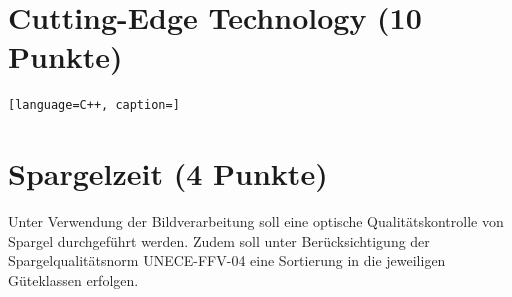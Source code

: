 \documentclass{ezb}
\begin{document}

\section{Cutting-Edge Technology (10 Punkte)}

\begin{lstlisting}[language=C++, caption=]

\end{lstlisting}

\newpage
\section{Spargelzeit (4 Punkte)}
Unter Verwendung der Bildverarbeitung soll eine optische Qualitätskontrolle von Spargel durchgeführt werden. Zudem soll unter Berücksichtigung der Spargelqualitätsnorm UNECE-FFV-04 eine Sortierung in die jeweiligen Güteklassen erfolgen.
\end{document}
